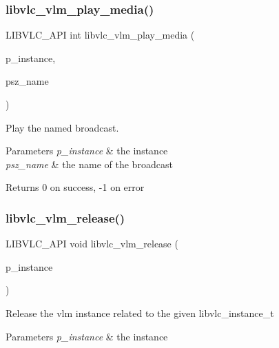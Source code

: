 \subsubsection{\texorpdfstring{libvlc\+\_\+vlm\+\_\+play\+\_\+media()}{libvlc\_vlm\_play\_media()}}
{\footnotesize\ttfamily L\+I\+B\+V\+L\+C\+\_\+\+A\+PI int libvlc\+\_\+vlm\+\_\+play\+\_\+media (\begin{DoxyParamCaption}\item[{\hyperlink{group__libvlc__core_ga316d739a80da4678206c79f4d6c2e284}{libvlc\+\_\+instance\+\_\+t} $\ast$}]{p\+\_\+instance,  }\item[{const char $\ast$}]{psz\+\_\+name }\end{DoxyParamCaption})}

Play the named broadcast.


\begin{DoxyParams}{Parameters}
{\em p\+\_\+instance} & the instance \\
\hline
{\em psz\+\_\+name} & the name of the broadcast \\
\hline
\end{DoxyParams}
\begin{DoxyReturn}{Returns}
0 on success, -\/1 on error 
\end{DoxyReturn}
\mbox{\label{group__libvlc__vlm_ga2ccd4f533e38fef695cedfcf2ad9138e}} 
\subsubsection{\texorpdfstring{libvlc\+\_\+vlm\+\_\+release()}{libvlc\_vlm\_release()}}
{\footnotesize\ttfamily L\+I\+B\+V\+L\+C\+\_\+\+A\+PI void libvlc\+\_\+vlm\+\_\+release (\begin{DoxyParamCaption}\item[{\hyperlink{group__libvlc__core_ga316d739a80da4678206c79f4d6c2e284}{libvlc\+\_\+instance\+\_\+t} $\ast$}]{p\+\_\+instance }\end{DoxyParamCaption})}

Release the vlm instance related to the given libvlc\+\_\+instance\+\_\+t


\begin{DoxyParams}{Parameters}
{\em p\+\_\+instance} & the instance \\
\hline
\end{DoxyParams}
\mbox{\label{group__libvlc__vlm_ga3712208ddc85be4dd70cb115487f755e}} 

